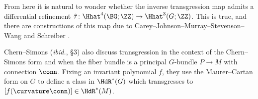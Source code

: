 \begin{remark}
From here it is natural to wonder whether the inverse transgression map admits a differential refinement
$\hat\tau\colon\Hhat^4(\BG;\ZZ)\to\Hhat^3(G;\ZZ)$. This is true, and there are constructions of this map due to
Carey--Johnson--Murray--Stevenson--Wang \cite[\S 3]{CJMSW05} and Schreiber \cite[1.4.1.2]{Urs}.

Chern--Simons (\textit{ibid.}, \S 3) also discuss transgression in the context of the Chern--Simons form and when
the fiber bundle is a principal $G$-bundle $P\to M$ with connection $\conn$. Fixing an invariant polynomial $f$,
they use the Maurer--Cartan form on $G$ to define a class in $\HdR^*(G)$
which transgresses to $[f(\curvature\conn)]\in\HdR^*(M)$.
\end{remark}
%
%
%
%
%
%
%
%
%

